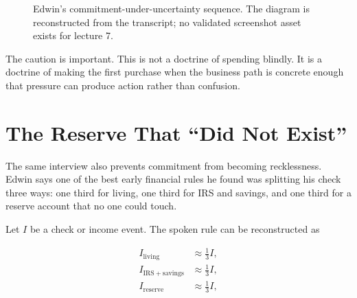 \documentclass[11pt,oneside]{book}
\begin{document}
\begin{figure}
\centering
{}
\caption{Edwin's commitment-under-uncertainty sequence. The diagram is reconstructed from the transcript; no validated screenshot asset exists for lecture 7.}
\end{figure}

The caution is important. This is not a doctrine of spending blindly. It is a doctrine of making the first purchase when the business path is concrete enough that pressure can produce action rather than confusion.

\section{The Reserve That ``Did Not Exist''}

The same interview also prevents commitment from becoming recklessness. Edwin says one of the best early financial rules he found was splitting his check three ways: one third for living, one third for IRS and savings, and one third for a reserve account that no one could touch.

Let \(I\) be a check or income event. The spoken rule can be reconstructed as

\begin{align}
I_{\mathrm{living}} &\approx \frac{1}{3}I,\\
I_{\mathrm{IRS+savings}} &\approx \frac{1}{3}I,\\
I_{\mathrm{reserve}} &\approx \frac{1}{3}I,
\end{align}
\end{document}
